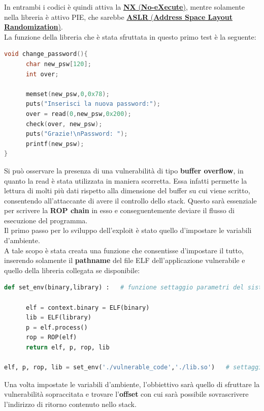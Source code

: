 In entrambi i codici è quindi attiva la \hyperref[sec:Def-W-xor-X]{\textbf{NX} (\textbf{No-eXecute})}, mentre solamente nella libreria è attivo PIE, che sarebbe \hyperref[sec:Def-ASLR]{\textbf{ASLR} (\textbf{Address Space Layout Randomization})}.\\
La funzione della libreria che è stata sfruttata in questo primo test è la seguente:
\begin{lstlisting}[language=C, label=change password, caption={funzione \textbf{change\_password()} della libreria condivisa.}, style=C lang]
void change_password(){
      char new_psw[120];
      int over;
        
      memset(new_psw,0,0x78);
      puts("Inserisci la nuova password:");
      over = read(0,new_psw,0x200);
      check(over, new_psw);
      puts("Grazie!\nPassword: ");
      printf(new_psw);
}
\end{lstlisting}
Si può osservare la presenza di una vulnerabilità di tipo \textbf{buffer overflow}, in quanto la read è stata utilizzata in maniera scorretta. Essa infatti permette la lettura di molti più dati rispetto alla dimensione del buffer su cui 
viene scritto, consentendo all'attaccante di avere il controllo dello stack. Questo sarà essenziale per scrivere la \textbf{ROP chain} in esso e conseguentemente deviare il flusso di esecuzione del programma.\\
Il primo passo per lo sviluppo dell'exploit è stato quello d'impostare le variabili d'ambiente.\\
A tale scopo è stata creata una funzione che consentisse d'impostare il tutto, inserendo solamente il \textbf{pathname} del file ELF dell'applicazione vulnerabile e quello della libreria collegata se disponibile:
\begin{lstlisting}[language=Python, label=env, caption={funzione di settaggio delle principali variabili d'ambiente e chiamata della stessa.}, style =Python]
def set_env(binary,library) :   # funzione settaggio parametri del sistema
    
      elf = context.binary = ELF(binary)
      lib = ELF(library)
      p = elf.process()
      rop = ROP(elf)
      return elf, p, rop, lib

elf, p, rop, lib = set_env('./vulnerable_code','./lib.so')   # settaggio variabili

\end{lstlisting}
Una volta impostate le variabili d'ambiente, l'obbiettivo sarà quello di sfruttare la vulnerabilità sopraccitata e trovare l'\textbf{offset} con cui sarà possibile sovrascrivere l'indirizzo di ritorno contenuto nello stack.\\
